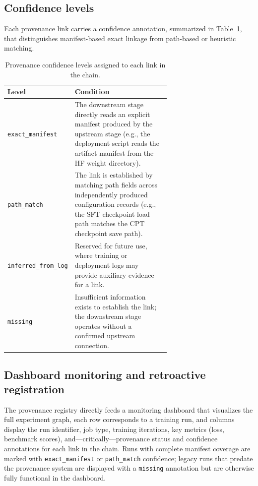 \subsection{Confidence levels}

Each provenance link carries a confidence annotation, summarized in
Table~\ref{tab:provenance_confidence}, that distinguishes
manifest-based exact linkage from path-based or heuristic matching.

\begin{table}[t]
\centering
\small
\caption{Provenance confidence levels assigned to each link in the chain.}
\label{tab:provenance_confidence}
\begin{tabular}{lp{0.65\linewidth}}
\toprule
Level & Condition \\
\midrule
\texttt{exact\_manifest}
  & The downstream stage directly reads an explicit manifest produced by the
  upstream stage (e.g., the deployment script reads the artifact manifest
  from the HF weight directory). \\
\texttt{path\_match}
  & The link is established by matching path fields across independently
  produced configuration records (e.g., the SFT checkpoint load path matches
  the CPT checkpoint save path). \\
\texttt{inferred\_from\_log}
  & Reserved for future use, where training or deployment logs may provide
  auxiliary evidence for a link. \\
\texttt{missing}
  & Insufficient information exists to establish the link; the downstream
  stage operates without a confirmed upstream connection. \\
\bottomrule
\end{tabular}
\end{table}

\subsection{Dashboard monitoring and retroactive registration}

The provenance registry directly feeds a monitoring dashboard that visualizes the
full experiment graph, each row corresponds to a training run, and
columns display the run identifier, job type, training iterations, key metrics
(loss, benchmark scores), and---critically---provenance status and confidence
annotations for each link in the chain. Runs with complete manifest coverage are
marked with \texttt{exact\_manifest} or \texttt{path\_match} confidence; legacy
runs that predate the provenance system are displayed with a \texttt{missing}
annotation but are otherwise fully functional in the dashboard.

